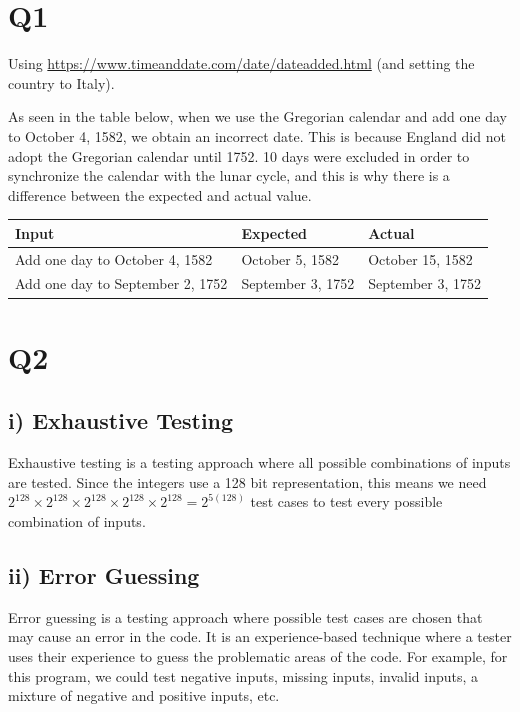 \documentclass[12pt, letterpaper, titlepage]{article}
\begin{document}
 
\onehalfspacing

\section*{Q1}
Using \url{https://www.timeanddate.com/date/dateadded.html} (and setting the country to Italy). 

As seen in the table below, when we use the Gregorian calendar and add one day to October 4, 1582, we obtain an incorrect date. This is because England did not adopt the Gregorian calendar until 1752. 10 days were excluded in order to synchronize the calendar with the lunar cycle, and this is why there is a difference between the expected and actual value.

\noindent
\begin{tabularx}{\textwidth}{|X|X|X|}
    \hline
    \textbf{Input} & \textbf{Expected} & \textbf{Actual} \\
    \hline
    Add one day to October 4, 1582 & October 5, 1582 & October 15, 1582 \\
    \hline
    Add one day to September 2, 1752 & September 3, 1752 & September 3, 1752 \\
    \hline
 \end{tabularx}

\section*{Q2}
\subsection*{i) Exhaustive Testing}
Exhaustive testing is a testing approach where all possible combinations of inputs are tested. Since the integers use a 128 bit representation, this means we need $2^{128} \times 2^{128} \times 2^{128} \times 2^{128} \times 2^{128} = 2^{5(128)}$ test cases to test every possible combination of inputs. 

\subsection*{ii) Error Guessing}
Error guessing is a testing approach where possible test cases are chosen that may cause an error in the code. It is an experience-based technique where a tester uses their experience to guess the problematic areas of the code. For example, for this program, we could test negative inputs, missing inputs, invalid inputs, a mixture of negative and positive inputs, etc.
\end{document}
